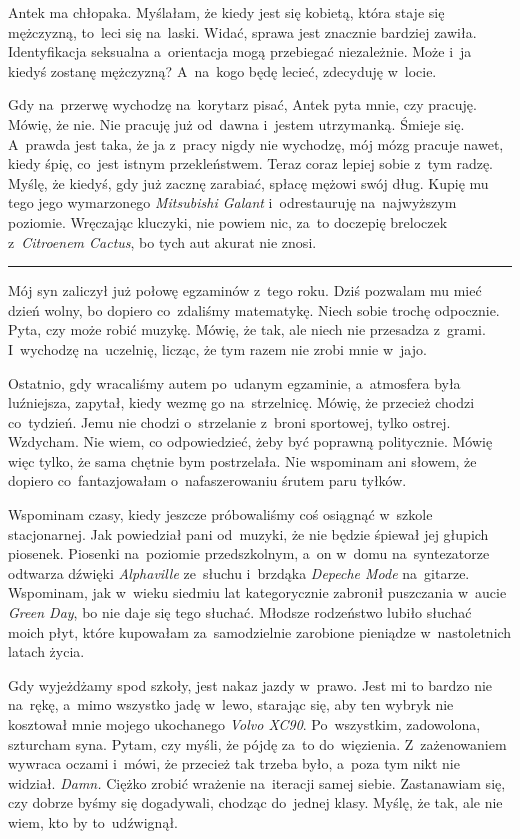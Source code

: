 \documentclass[9pt, a5paper]{memoir}
\begin{document}
Antek ma chłopaka. Myślałam, że kiedy jest się kobietą, która staje się mężczyzną, to~leci się na~laski. Widać, sprawa jest znacznie bardziej zawiła. Identyfikacja seksualna a~orientacja mogą przebiegać niezależnie. Może i~ja kiedyś zostanę mężczyzną? A~na~kogo będę lecieć, zdecyduję w~locie.

Gdy na~przerwę wychodzę na~korytarz pisać, Antek pyta mnie, czy pracuję. Mówię, że nie. Nie pracuję już od~dawna i~jestem utrzymanką. Śmieje się. A~prawda jest taka, że ja z~pracy nigdy nie wychodzę, mój mózg pracuje nawet, kiedy śpię, co~jest istnym przekleństwem. Teraz coraz lepiej sobie z~tym radzę. Myślę, że kiedyś, gdy już zacznę zarabiać, spłacę mężowi swój dług. Kupię mu tego jego wymarzonego \textit{Mitsubishi Galant} i~odrestauruję na~najwyższym poziomie. Wręczając kluczyki, nie powiem nic, za~to doczepię breloczek z~\textit{Citroenem Cactus}, bo tych aut akurat nie znosi.

\fancybreak{* \quad * \quad *}

Mój syn zaliczył już połowę egzaminów z~tego roku. Dziś pozwalam mu mieć dzień wolny, bo dopiero co~zdaliśmy matematykę. Niech sobie trochę odpocznie. Pyta, czy może robić muzykę. Mówię, że tak, ale niech nie przesadza z~grami. I~wychodzę na~uczelnię, licząc, że tym razem nie zrobi mnie w~jajo.

Ostatnio, gdy wracaliśmy autem po~udanym egzaminie, a~atmosfera była luźniejsza, zapytał, kiedy wezmę go na~strzelnicę. Mówię, że przecież chodzi co~tydzień. Jemu nie chodzi o~strzelanie z~broni sportowej, tylko ostrej. Wzdycham. Nie wiem, co odpowiedzieć, żeby być poprawną politycznie. Mówię więc tylko, że sama chętnie bym postrzelała. Nie wspominam ani słowem, że dopiero co~fantazjowałam o~nafaszerowaniu śrutem paru tyłków.

Wspominam czasy, kiedy jeszcze próbowaliśmy coś osiągnąć w~szkole stacjonarnej. Jak powiedział pani od~muzyki, że nie będzie śpiewał jej głupich piosenek. Piosenki na~poziomie przedszkolnym, a~on w~domu na~syntezatorze odtwarza dźwięki \textit{Alphaville} ze~słuchu i~brzdąka \textit{Depeche Mode} na~gitarze. Wspominam, jak w~wieku siedmiu lat kategorycznie zabronił puszczania w~aucie \textit{Green Day}, bo nie daje się tego słuchać. Młodsze rodzeństwo lubiło słuchać moich płyt, które kupowałam za~samodzielnie zarobione pieniądze w~nastoletnich latach życia.

Gdy wyjeżdżamy spod szkoły, jest nakaz jazdy w~prawo. Jest mi to bardzo nie na~rękę, a~mimo wszystko jadę w~lewo, starając się, aby ten wybryk nie kosztował mnie mojego ukochanego \textit{Volvo XC90}. Po~wszystkim, zadowolona, szturcham syna. Pytam, czy myśli, że pójdę za~to do~więzienia. Z~zażenowaniem wywraca oczami i~mówi, że przecież tak trzeba było, a~poza tym nikt nie widział. \textit{Damn.} Ciężko zrobić wrażenie na~iteracji samej siebie. Zastanawiam się, czy dobrze byśmy się dogadywali, chodząc do~jednej klasy. Myślę, że tak, ale nie wiem, kto by to~udźwignął.
\end{document}
